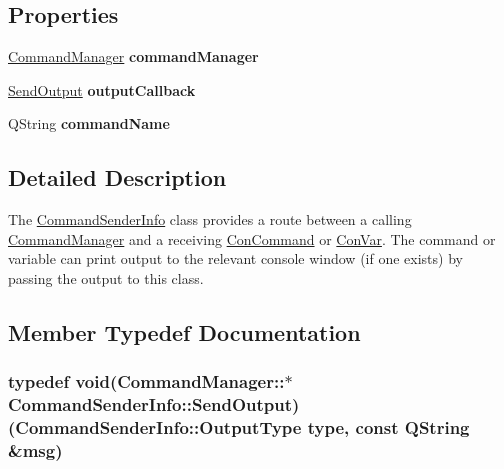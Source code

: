 \subsection*{Properties}
\begin{DoxyCompactItemize}
\item 
\hypertarget{class_command_sender_info_a976ad24d5ec178fe255a33db3bde2ae2}{\hyperlink{class_command_manager}{Command\-Manager} {\bfseries command\-Manager}}\label{class_command_sender_info_a976ad24d5ec178fe255a33db3bde2ae2}

\item 
\hypertarget{class_command_sender_info_a401f29853a9d31f0a4cabd9f5b87bfee}{\hyperlink{class_command_sender_info_a68c494ef69a25ac7bf667b83e24639ed}{Send\-Output} {\bfseries output\-Callback}}\label{class_command_sender_info_a401f29853a9d31f0a4cabd9f5b87bfee}

\item 
\hypertarget{class_command_sender_info_af9825e2019cac0c5c9793eefe8086b6c}{Q\-String {\bfseries command\-Name}}\label{class_command_sender_info_af9825e2019cac0c5c9793eefe8086b6c}

\end{DoxyCompactItemize}


\subsection{Detailed Description}
The \hyperlink{class_command_sender_info}{Command\-Sender\-Info} class provides a route between a calling \hyperlink{class_command_manager}{Command\-Manager} and a receiving \hyperlink{class_con_command}{Con\-Command} or \hyperlink{class_con_var}{Con\-Var}. The command or variable can print output to the relevant console window (if one exists) by passing the output to this class. 

\subsection{Member Typedef Documentation}
\hypertarget{class_command_sender_info_a68c494ef69a25ac7bf667b83e24639ed}{
\subsubsection[{Send\-Output}]{\setlength{\rightskip}{0pt plus 5cm}typedef void(Command\-Manager\-::$\ast$ Command\-Sender\-Info\-::\-Send\-Output)({\bf Command\-Sender\-Info\-::\-Output\-Type} type, const Q\-String \&msg)}}\label{class_command_sender_info_a68c494ef69a25ac7bf667b83e24639ed}


